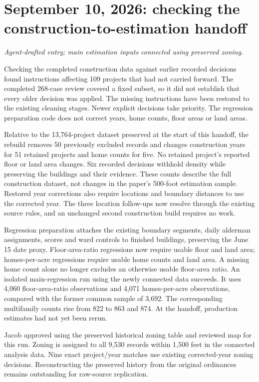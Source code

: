 \clearpage
\section*{September 10, 2026: checking the construction-to-estimation handoff}
\textit{Agent-drafted entry; main estimation inputs connected using preserved zoning.}

Checking the completed construction data against earlier recorded decisions found instructions affecting 109 projects that had not carried forward. The completed 268-case review covered a fixed subset, so it did not establish that every older decision was applied. The missing instructions have been restored to the existing cleaning stages. Newer explicit decisions take priority. The regression preparation code does not correct years, home counts, floor areas or land areas.

Relative to the 13,764-project dataset preserved at the start of this handoff, the rebuild removes 50 previously excluded records and changes construction years for 51 retained projects and home counts for five. No retained project's reported floor or land area changes. Six recorded decisions withhold density while preserving the buildings and their evidence. These counts describe the full construction dataset, not changes in the paper's 500-foot estimation sample. Restored year corrections also require locations and boundary distances to use the corrected year. The three location follow-ups now resolve through the existing source rules, and an unchanged second construction build requires no work.

Regression preparation attaches the existing boundary segments, daily alderman assignments, scores and ward controls to finished buildings, preserving the June 15 date proxy. Floor-area-ratio regressions now require usable floor and land area; homes-per-acre regressions require usable home counts and land area. A missing home count alone no longer excludes an otherwise usable floor-area ratio. An isolated main-regression run using the newly connected data succeeds. It uses 4,060 floor-area-ratio observations and 4,071 homes-per-acre observations, compared with the former common sample of 3,692. The corresponding multifamily counts rise from 822 to 863 and 874. At the handoff, production estimates had not yet been rerun.

Jacob approved using the preserved historical zoning table and reviewed map for this run. Zoning is assigned to all 9,530 records within 1,500 feet in the connected analysis data. Nine exact project/year matches use existing corrected-year zoning decisions. Reconstructing the preserved history from the original ordinances remains outstanding for raw-source replication.

